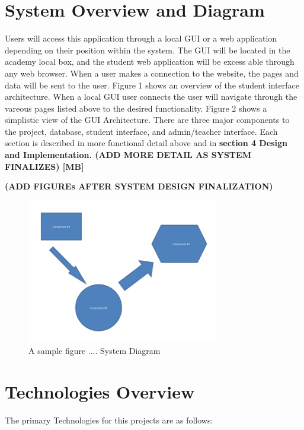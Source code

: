 \section{System Overview and Diagram}
Users will access this application through a local GUI or a web application depending on their position within the system. The GUI will be located in the academy local box, and the student web application will be excess able through any web browser.
When a user makes a connection to the website, the pages and data will be sent to the user. Figure 1 shows an overview of the student interface architecture.
When a local GUI user connects the user will navigate through the vareous pages listed above to the desired functionality. Figure 2 shows a simplistic view of the GUI Architecture.
There are three major components to the project, database, student interface, and admin/teacher interface.  Each section is described in more functional detail above and in \bf section 4 Design and Implementation.
\bf (ADD MORE DETAIL AS SYSTEM FINALIZES) [MB]


\bf(ADD FIGUREs AFTER SYSTEM DESIGN FINALIZATION)
\begin{figure}[tbh]
\begin{center}
\includegraphics[width=0.75\textwidth]{./diagram}
\end{center}
\caption{A sample figure .... System Diagram \label{systemdiagram}}
\end{figure}

\section{Technologies Overview}
The primary Technologies for this projects are as follows:

